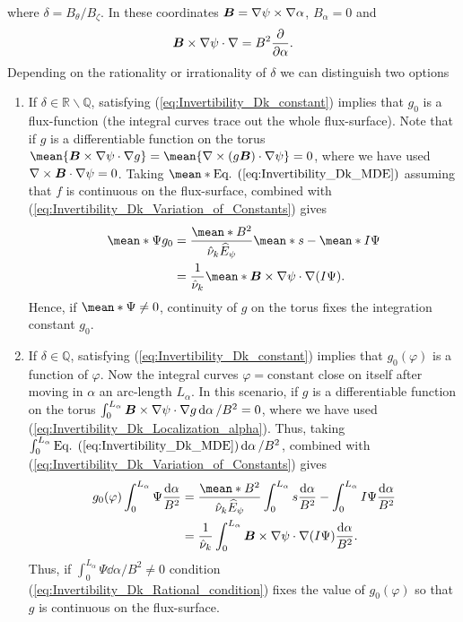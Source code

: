 where $\delta = B_\theta/B_\zeta$. In these coordinates $\vb*{B} =\nabla \psi \times \nabla \alpha $, $B_\alpha = 0$ and
%
\begin{align}
	\vb*{B}\times\nabla \psi \cdot \nabla = 
	B^2 \pdv{}{\alpha}.
	\label{eq:Invertibility_Dk_Localization_alpha}
\end{align}
%
Depending on the rationality or irrationality of $\delta$ we can distinguish two options
%
\begin{enumerate}
	\item If $\delta \in \mathbb{R}\backslash\mathbb{Q}$, satisfying (\ref{eq:Invertibility_Dk_constant}) implies that $g_0$ is a flux-function (the integral curves trace out the whole flux-surface). Note that if $g$ is a differentiable function on the torus $\mean{ \vb*{B} \times \nabla \psi \cdot \nabla g } = \mean{ \nabla\times (g\vb*{B}) \cdot\nabla \psi }=0$, where we have used $\nabla\times\vb*{B}\cdot\nabla\psi = 0$. Taking $\mean*{\text{Eq. (\ref{eq:Invertibility_Dk_MDE})}}$ assuming that $f$ is continuous on the flux-surface, combined with (\ref{eq:Invertibility_Dk_Variation_of_Constants}) gives
	\begin{align} 
		\mean*{\Psi} g_0  
		& = 
		\frac{ \mean*{B^2} }{ \hat{\nu}_k \widehat{E}_\psi } 
		\mean*{s}
		- 
		\mean*{I \Psi}\nonumber
		\\
		& = 
		\frac{1}{\hat{\nu}_k}
		\mean*{\vb*{B}\times\nabla \psi \cdot \nabla(I \Psi)}. 
		\label{eq:Invertibility_Dk_Ergodic_condition}
	\end{align}
    Hence, if $\mean*{\Psi}\ne 0$, continuity of $g$ on the torus fixes the integration constant $g_0$. 

    \item If $\delta \in \mathbb{Q}$, satisfying (\ref{eq:Invertibility_Dk_constant}) implies that $g_0(\varphi)$ is a function of $\varphi$. Now the integral curves $\varphi=\text{constant}$ close on itself after moving in $\alpha$ an arc-length $L_\alpha$. In this scenario, if $g$ is a differentiable function on the torus $\int_{0}^{L_\alpha}\vb*{B}\times \nabla\psi \cdot \nabla g \dd{\alpha}/ B^2  = 0$, where we have used (\ref{eq:Invertibility_Dk_Localization_alpha}). Thus, taking $\int_{0}^{L_\alpha}\text{Eq. (\ref{eq:Invertibility_Dk_MDE})} \dd{\alpha}/ B^2 $, combined with (\ref{eq:Invertibility_Dk_Variation_of_Constants}) gives
    \begin{align}
      g_0(\varphi) \int_{0}^{L_\alpha} \Psi\frac{\dd{\alpha}}{ B^2 }
      & = 
      \frac{ \mean*{B^2} }{ \hat{\nu}_k \widehat{E}_\psi }
      \int_{0}^{L_\alpha} s    \frac{\dd{\alpha}}{ B^2 }
      \nonumber 
-      
      \int_{0}^{L_\alpha}   I \Psi  \frac{\dd{\alpha}}{ B^2 }
      \\
      & =       
      \frac{1}{\hat{\nu}_k}
      \int_{0}^{L_\alpha}
      \vb*{B}\times\nabla \psi \cdot \nabla(I \Psi)
      \frac{\dd{\alpha}}{ B^2 }
      .
      \label{eq:Invertibility_Dk_Rational_condition}
    \end{align}
    Thus, if $\int_{0}^{L_\alpha} \Psi \dd{\alpha} / B^2 \ne 0 $ condition (\ref{eq:Invertibility_Dk_Rational_condition}) fixes the value of $g_0(\varphi)$ so that $g$ is continuous on the flux-surface. 
    

\end{enumerate}
